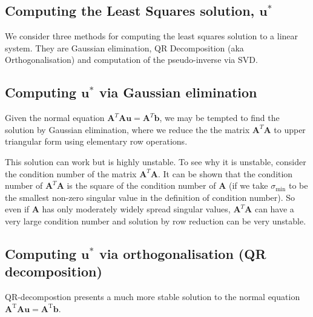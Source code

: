 \subsection{Computing the Least Squares solution, $\mathbf u^*$ }

We consider three methods for computing the least squares solution to a linear system.  They are Gaussian elimination, QR Decomposition (aka Orthogonalisation) and computation of the pseudo-inverse via SVD.


\subsection{Computing $\mathbf u^*$ via Gaussian elimination}

Given the normal equation $\mathbf A^T\mathbf{Au} = \mathbf A^T\mathbf b$, we may be tempted to find the solution  by Gaussian elimination, where we reduce the the matrix $\mathbf A^T \mathbf A$ to upper triangular form using elementary row operations.

This solution can work but is highly unstable.  To see why it is unstable, consider the condition number of the matrix $\mathbf A^T \mathbf A$.   It can be shown that the condition number of $\mathbf A^T \mathbf A$ is the square of the condition number of $\mathbf A$  (if we take $\sigma_{\min}$ to be the smallest non-zero singular value in the definition of condition number).  So  even if $\mathbf A$ has only moderately widely spread singular values, $\mathbf A^T\mathbf A$  can have a very large condition number and solution by row reduction can be very unstable.




\subsection{Computing $\mathbf u^*$ via orthogonalisation (QR decomposition)}

QR-decompostion presents a much more stable solution to   the normal equation $\mathbf A^\mathrm T\mathbf{Au} = \mathbf A^ \mathrm T\mathbf b$.

